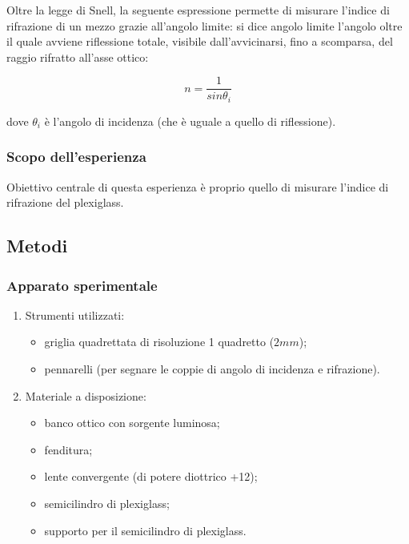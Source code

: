 \documentclass{article}
\begin{document}
Oltre la legge di Snell, la seguente espressione permette di misurare l'indice di rifrazione di un mezzo grazie all'angolo limite: si dice angolo limite l'angolo oltre il quale avviene riflessione totale, visibile dall'avvicinarsi, fino a scomparsa, del raggio rifratto all'asse ottico: 

\begin{equation}
    n = \frac{1}{sin \theta_i}
    \label{n}
\end{equation}
\FloatBarrier

dove $\theta_i$ è l'angolo di incidenza (che è uguale a quello di riflessione).

\vspace{1em}

\subsubsection{Scopo dell'esperienza} %
Obiettivo centrale di questa esperienza è proprio quello di misurare l'indice di rifrazione del plexiglass.

\vspace{2em}

\subsection{Metodi}
\subsubsection{Apparato sperimentale} %
\begin{enumerate}
    \item Strumenti utilizzati:
    \begin{itemize}
        \item griglia quadrettata di risoluzione 1 quadretto ($2mm$);
        \item pennarelli (per segnare le coppie di angolo di incidenza e rifrazione).
    \end{itemize}

    \item Materiale a disposizione:
    \begin{itemize}
        \item banco ottico con sorgente luminosa;
        \item fenditura;
        \item lente convergente (di potere diottrico +12);
        \item semicilindro di plexiglass;
        \item supporto per il semicilindro di plexiglass.
    \end{itemize}
\end{enumerate}
\FloatBarrier
\end{document}
